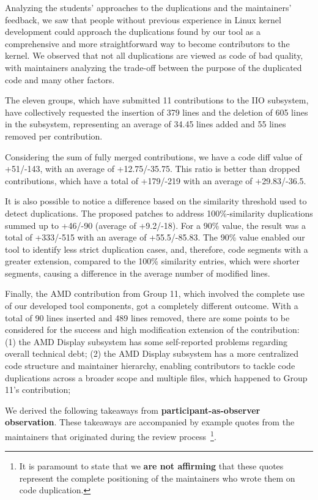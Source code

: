 \documentclass[10pt,conference]{IEEEtran}
\begin{document}
Analyzing the students' approaches to the duplications and the maintainers' feedback, we saw that people without previous experience in Linux kernel development could approach the duplications found by our tool as a comprehensive and more straightforward way to become contributors to the kernel. We observed that not all duplications are viewed as code of bad quality, with maintainers analyzing the trade-off between the purpose of the duplicated code and many other factors.

The eleven groups, which have submitted 11 contributions to the IIO subsystem, have collectively requested the insertion of 379 lines and the deletion of 605 lines in the subsystem, representing an average of 34.45 lines added and 55 lines removed per contribution.

Considering the sum of fully merged contributions, we have a code diff value of +51/-143, with an average of +12.75/-35.75. This ratio is better than dropped contributions, which have a total of +179/-219 with an average of +29.83/-36.5.

It is also possible to notice a difference based on the similarity threshold used to detect duplications. The proposed patches to address 100\%-similarity duplications summed up to +46/-90 (average of +9.2/-18). For a 90\% value, the result was a total of +333/-515 with an average of +55.5/-85.83. The 90\% value enabled our tool to identify less strict duplication cases, and, therefore, code segments with a greater extension, compared to the 100\% similarity entries, which were shorter segments, causing a difference in the average number of modified lines.

Finally, the AMD contribution from Group 11, which involved the complete use of our developed tool components, got a completely different outcome. With a total of 90 lines inserted and 489 lines removed, there are some points to be considered for the success and high modification extension of the contribution: (1) the AMD Display subsystem has some self-reported problems regarding overall technical debt; (2) the AMD Display subsystem has a more centralized code structure and maintainer hierarchy, enabling contributors to tackle code duplications across a broader scope and multiple files, which happened to Group 11's contribution;

We derived the following takeaways from \textbf{participant-as-observer observation}. These takeaways are accompanied by example quotes from the maintainers that originated during the review process~\footnote{It is paramount to state that we \textbf{are not affirming} that these quotes represent the complete positioning of the maintainers who wrote them on code duplication.}.
\end{document}
